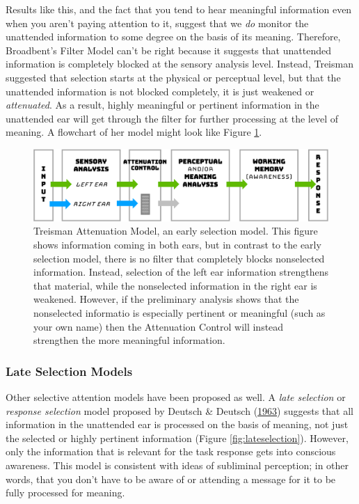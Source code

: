 \documentclass[
]{krantz}
\begin{document}
Results like this, and the fact that you tend to hear meaningful information even when you aren't paying attention to it, suggest that we \emph{do} monitor the unattended information to some degree on the basis of its meaning. Therefore, Broadbent's Filter Model can't be right because it suggests that unattended information is completely blocked at the sensory analysis level. Instead, Treisman suggested that selection starts at the physical or perceptual level, but that the unattended information is not blocked completely, it is just weakened or \emph{attenuated}. As a result, highly meaningful or pertinent information in the unattended ear will get through the filter for further processing at the level of meaning. A flowchart of her model might look like Figure \ref{fig:treisman}.

\begin{figure}

{\centering \includegraphics[width=0.8\linewidth]{images/ch3/fig4} 

}

\caption{Treisman Attenuation Model, an early selection model. This figure shows information coming in both ears, but in contrast to the early selection model, there is no filter that completely blocks nonselected information. Instead, selection of the left ear information strengthens that material, while the nonselected information in the right ear is weakened. However, if the preliminary analysis shows that the nonselected informatio is especially pertinent or meaningful (such as your own name) then the Attenuation Control will instead strengthen the more meaningful information.}\label{fig:treisman}
\end{figure}

\hypertarget{late-selection-models}{%
\subsubsection*{Late Selection Models}\label{late-selection-models}}


Other selective attention models have been proposed as well. A \emph{late selection} or \emph{response selection} model proposed by Deutsch \& Deutsch (\protect\hyperlink{ref-Deutsch1963}{1963}) suggests that all information in the unattended ear is processed on the basis of meaning, not just the selected or highly pertinent information (Figure \ref{fig:lateselection}). However, only the information that is relevant for the task response gets into conscious awareness. This model is consistent with ideas of subliminal perception; in other words, that you don't have to be aware of or attending a message for it to be fully processed for meaning.
\end{document}
